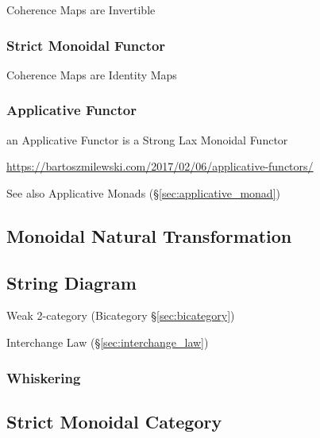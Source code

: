 Coherence Maps are Invertible



\subsubsection{Strict Monoidal Functor}\label{sec:strict_monoidal_functor}

Coherence Maps are Identity Maps



\subsubsection{Applicative Functor}\label{sec:applicative_functor}

an Applicative Functor is a Strong Lax Monoidal Functor

\url{https://bartoszmilewski.com/2017/02/06/applicative-functors/}

\fist See also Applicative Monads (\S\ref{sec:applicative_monad})



\subsection{Monoidal Natural Transformation}
\label{sec:monoidal_natural_transformation}

\subsection{String Diagram}\label{sec:string_diagram}

Weak 2-category (Bicategory \S\ref{sec:bicategory})

Interchange Law (\S\ref{sec:interchange_law})



\subsubsection{Whiskering}\label{sec:whiskering}



\subsection{Strict Monoidal Category}\label{sec:strict_monoidal}


